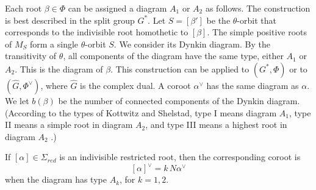 Each root $\beta\in\Phi$
can be assigned a diagram  $A_1$ or $A_2$ as follows.  
The construction is best described in the split group $G^*$.
Let $S=[\beta']$ be the $\theta$-orbit that corresponds to the indivisible
root homothetic to $[\beta]$.  
The simple
positive roots of $M_S$ form a single $\theta$-orbit $S$.  We consider
its Dynkin diagram.
By the transitivity of $\theta$,  all components of the diagram have the same type,
either  $A_1$
or $A_2$.  This is the diagram  of $\beta$.
This construction can be applied to $(G^*,\Phi)$ or to $(\hat G,\Phi^\vee)$, where $\hat G$
is the complex dual.
A coroot $\alpha^\vee$ has the same diagram  as $\alpha$.
We let $b(\beta)$ be the number of connected components of the Dynkin diagram.
(According to the types of Kottwitz and Shelstad, type I means diagram $A_1$, type II means
a simple root in diagram $A_2$, and type III means a highest root in diagram $A_2$ 
\cite{kottwitz1999foundations}.)






\begin{lemma}\label{lemma:norm}
If $[\alpha]\in\Sigma_{red}$ is an indivisible restricted root, then the corresponding coroot is
\begin{equation}\label{eqn:norm}
[\alpha]^\vee = k\, N\alpha^\vee
\end{equation}
when the diagram has type $A_k$, for $k=1,2$.
\end{lemma}

